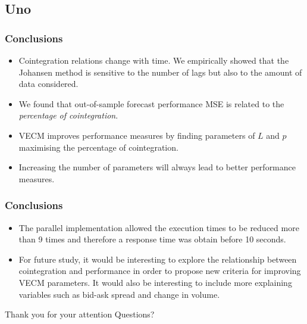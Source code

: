 \documentclass[compress,red]{beamer}
\begin{document}
\subsection{Uno}
\begin{frame}
\frametitle{Conclusions}
\begin{itemize}
\item Cointegration relations change with time. We empirically showed that the Johansen method is sensitive to the number of lags but also to the amount of data considered.
\item We found that out-of-sample forecast performance MSE is related to the {\em percentage of cointegration\/}.  
\item VECM improves performance measures by finding
parameters of $L$ and $p$ maximising the percentage of cointegration.
\item Increasing the number of parameters will always lead to
better performance measures.
\end{itemize}
\end{frame}

\begin{frame}
\frametitle{Conclusions}
\begin{itemize}
\item The parallel implementation allowed the execution times to be reduced
more than 9 times and therefore a response time was obtain before 10
seconds. 
\item For future study, it would be interesting to explore the relationship between
cointegration and performance in order to propose new criteria for
improving VECM parameters. It would also be interesting to include more 
explaining variables such as bid-ask spread and change in volume.
\end{itemize}
\end{frame}

\begin{frame}[plain,c]
\begin{center}
\Huge Thank you for your attention
\Huge Questions?
\end{center}
\end{frame}
\end{document}
